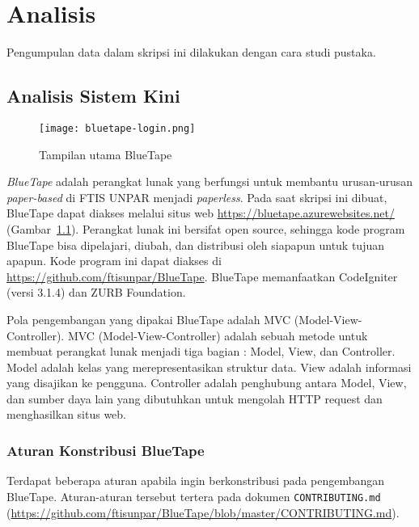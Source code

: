 
\chapter{Analisis}
\label{chap:analisis}
	Pengumpulan data dalam skripsi ini dilakukan dengan cara studi pustaka.

\section{Analisis Sistem Kini}
\label{sec:analisiskini}
\begin{figure}[H]
	\centering  
	\texttt{[image: bluetape-login.png]}  
	\caption[Tampilan utama BlueTape]{Tampilan utama BlueTape} 
	\label{fig:bluetape-login} 
\end{figure}

	\textit{BlueTape} adalah perangkat lunak yang berfungsi untuk membantu urusan-urusan \textit{paper-based} di FTIS UNPAR menjadi \textit{paperless}. Pada saat skripsi ini dibuat, BlueTape dapat diakses melalui situs web \url{https://bluetape.azurewebsites.net/} (Gambar~\ref{fig:bluetape-login}). Perangkat lunak ini bersifat open source, sehingga kode program BlueTape bisa dipelajari, diubah, dan distribusi oleh siapapun untuk tujuan apapun. Kode program ini dapat diakses di \url{https://github.com/ftisunpar/BlueTape}. BlueTape memanfaatkan CodeIgniter (versi 3.1.4) dan ZURB Foundation.
	
	Pola pengembangan yang dipakai BlueTape adalah MVC (Model-View-Controller). MVC (Model-View-Controller) adalah sebuah metode untuk membuat perangkat lunak menjadi tiga bagian : Model, View, dan Controller. Model adalah kelas yang merepresentasikan struktur data. View adalah informasi yang disajikan ke pengguna. Controller adalah penghubung antara Model, View, dan sumber daya lain yang dibutuhkan untuk mengolah HTTP request dan menghasilkan situs web.

\subsection{Aturan Konstribusi BlueTape}
	Terdapat beberapa aturan apabila ingin berkonstribusi pada pengembangan BlueTape. Aturan-aturan tersebut tertera pada dokumen \texttt{CONTRIBUTING.md} (\url{https://github.com/ftisunpar/BlueTape/blob/master/CONTRIBUTING.md}).

